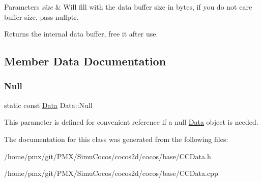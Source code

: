 \begin{DoxyParams}{Parameters}
{\em size} & Will fill with the data buffer size in bytes, if you do not care buffer size, pass nullptr. \\
\hline
\end{DoxyParams}
\begin{DoxyReturn}{Returns}
the internal data buffer, free it after use. 
\end{DoxyReturn}


\subsection{Member Data Documentation}
\mbox{\label{classData_a4a1177cbbd51dad568fd641a5c173711}} 
\subsubsection{\texorpdfstring{Null}{Null}}
{\footnotesize\ttfamily static const \hyperlink{classData}{Data} Data\+::\+Null\hspace{0.3cm}{\ttfamily [static]}}

This parameter is defined for convenient reference if a null \hyperlink{classData}{Data} object is needed. 

The documentation for this class was generated from the following files\+:\begin{DoxyCompactItemize}
\item 
/home/pmx/git/\+P\+M\+X/\+Simu\+Cocos/cocos2d/cocos/base/C\+C\+Data.\+h\item 
/home/pmx/git/\+P\+M\+X/\+Simu\+Cocos/cocos2d/cocos/base/C\+C\+Data.\+cpp\end{DoxyCompactItemize}
